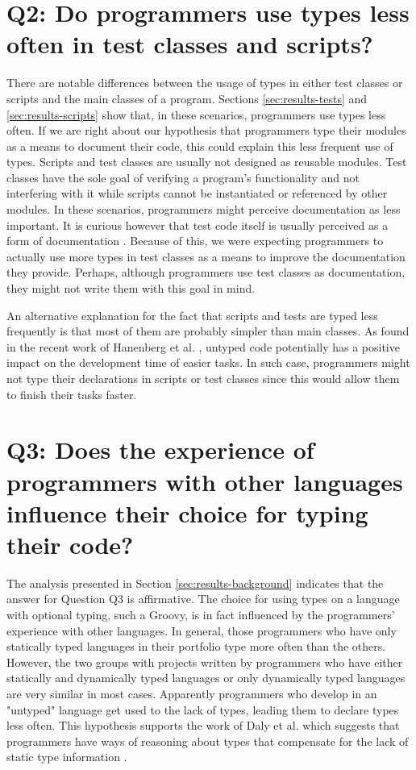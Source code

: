 \documentclass[msc]{ppgccufmg}
\begin{document}
\section*{Q2: Do programmers use types less often in test classes and scripts?\label{discussion-q2}}
There are notable differences between the usage of types in either test classes or scripts and the main classes of a program.
Sections \ref{sec:results-tests} and \ref{sec:results-scripts} show that, in these scenarios, programmers use types less often.
If we are right about our hypothesis that programmers type their modules as a means to document their code, this could explain this less frequent use of types.
Scripts and test classes are usually not designed as reusable modules.
Test classes have the sole goal of verifying a program's functionality and not interfering with it while scripts cannot be instantiated or referenced by other modules.
In these scenarios, programmers might perceive documentation as less important.
It is curious however that test code itself is usually perceived as a form of documentation \cite{Beck03,Meyerovich13}.
Because of this, we were expecting programmers to actually use more types in test classes as a means to improve the documentation they provide.
Perhaps, although programmers use test classes as documentation, they might not write them with this goal in mind.

An alternative explanation for the fact that scripts and tests are typed less frequently is that most of them are probably simpler than main classes.
As found in the recent work of Hanenberg et al. \cite{Hanenberg13}, untyped code potentially has a positive impact on the development time of easier tasks.
In such case, programmers might not type their declarations in scripts or test classes since this would allow them to finish their tasks faster.

\section*{Q3: Does the experience of programmers with other languages influence their choice for typing their code?\label{discussion-q3}}
The analysis presented in Section \ref{sec:results-background} indicates that the answer for Question Q3 is affirmative.
The choice for using types on a language with optional typing, such a Groovy, is in fact influenced by the programmers' experience with other languages.
In general, those programmers who have only statically typed languages in their portfolio type more often than the others.
However, the two groups with projects written by programmers who have either statically and dynamically typed languages or only dynamically typed languages are very similar in most cases.
Apparently programmers who develop in an "untyped" language get used to the lack of types, leading them to declare types less often.
This hypothesis supports the work of Daly et al. which suggests that programmers have ways of reasoning about types that compensate for the lack of static type information \cite{ruby_vs_druby}.
\end{document}
